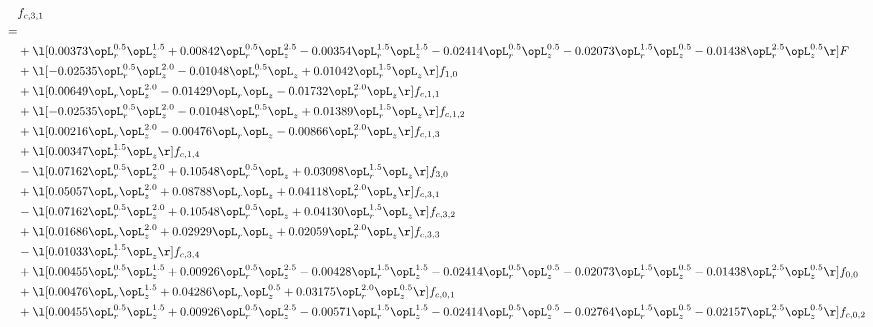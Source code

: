 \begin{alignat}{2} 
\label{eq:f_31_1} 
& f_{c,3,1} \nonumber \\ 
 = \\ 
& + \l[  0.00373 \opL_r^{0.5} \opL_z^{1.5} +  0.00842 \opL_r^{0.5} \opL_z^{2.5}   -0.00354 \opL_r^{1.5} \opL_z^{1.5}   -0.02414 \opL_r^{0.5} \opL_z^{0.5}   -0.02073 \opL_r^{1.5} \opL_z^{0.5}   -0.01438 \opL_r^{2.5} \opL_z^{0.5}  \r] F \nonumber \\ 
& + \l[  -0.02535 \opL_r^{0.5} \opL_z^{2.0}   -0.01048 \opL_r^{0.5} \opL_z +  0.01042 \opL_r^{1.5} \opL_z  \r] f_{1,0} \nonumber \\ 
& + \l[  0.00649 \opL_r \opL_z^{2.0}   -0.01429 \opL_r \opL_z   -0.01732 \opL_r^{2.0} \opL_z  \r] f_{c,1,1} \nonumber \\ 
& + \l[  -0.02535 \opL_r^{0.5} \opL_z^{2.0}   -0.01048 \opL_r^{0.5} \opL_z +  0.01389 \opL_r^{1.5} \opL_z  \r] f_{c,1,2} \nonumber \\ 
& + \l[  0.00216 \opL_r \opL_z^{2.0}   -0.00476 \opL_r \opL_z   -0.00866 \opL_r^{2.0} \opL_z  \r] f_{c,1,3} \nonumber \\ 
& + \l[  0.00347 \opL_r^{1.5} \opL_z  \r] f_{c,1,4} \nonumber \\ 
& - \l[  0.07162 \opL_r^{0.5} \opL_z^{2.0} +  0.10548 \opL_r^{0.5} \opL_z +  0.03098 \opL_r^{1.5} \opL_z  \r] f_{3,0} \nonumber \\ 
& + \l[  0.05057 \opL_r \opL_z^{2.0} +  0.08788 \opL_r \opL_z +  0.04118 \opL_r^{2.0} \opL_z  \r] f_{c,3,1} \nonumber \\ 
& - \l[  0.07162 \opL_r^{0.5} \opL_z^{2.0} +  0.10548 \opL_r^{0.5} \opL_z +  0.04130 \opL_r^{1.5} \opL_z  \r] f_{c,3,2} \nonumber \\ 
& + \l[  0.01686 \opL_r \opL_z^{2.0} +  0.02929 \opL_r \opL_z +  0.02059 \opL_r^{2.0} \opL_z  \r] f_{c,3,3} \nonumber \\ 
& - \l[  0.01033 \opL_r^{1.5} \opL_z  \r] f_{c,3,4} \nonumber \\ 
& + \l[  0.00455 \opL_r^{0.5} \opL_z^{1.5} +  0.00926 \opL_r^{0.5} \opL_z^{2.5}   -0.00428 \opL_r^{1.5} \opL_z^{1.5}   -0.02414 \opL_r^{0.5} \opL_z^{0.5}   -0.02073 \opL_r^{1.5} \opL_z^{0.5}   -0.01438 \opL_r^{2.5} \opL_z^{0.5}  \r] f_{0,0} \nonumber \\ 
& + \l[  0.00476 \opL_r \opL_z^{1.5} +  0.04286 \opL_r \opL_z^{0.5} +  0.03175 \opL_r^{2.0} \opL_z^{0.5}  \r] f_{c,0,1} \nonumber \\ 
& + \l[  0.00455 \opL_r^{0.5} \opL_z^{1.5} +  0.00926 \opL_r^{0.5} \opL_z^{2.5}   -0.00571 \opL_r^{1.5} \opL_z^{1.5}   -0.02414 \opL_r^{0.5} \opL_z^{0.5}   -0.02764 \opL_r^{1.5} \opL_z^{0.5}   -0.02157 \opL_r^{2.5} \opL_z^{0.5}  \r] f_{c,0,2} \nonumber \\ 

\end{alignat}
